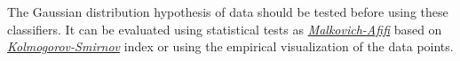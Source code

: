 \documentclass{standalone}
\begin{document}
The Gaussian distribution hypothesis of data should be tested before using these classifiers.
It can be evaluated using statistical tests as \href{https://www.jstor.org/stable/2284163?seq=1#page_scan_tab_contents}{\emph{Malkovich-Afifi}} based on \href{https://en.wikipedia.org/wiki/Kolmogorov–Smirnov_test}{\emph{Kolmogorov-Smirnov}} index or using the empirical visualization of the data points.
\end{document}
